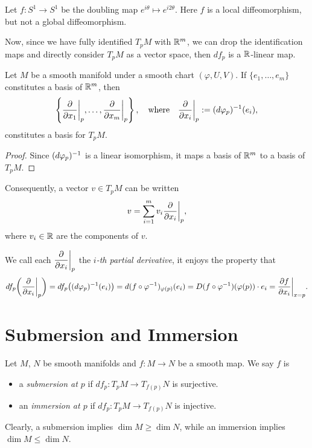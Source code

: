 \begin{example}
  Let \(f:S^1\to S^1\) be the doubling map \(e^{i\theta}\mapsto e^{i2\theta}\). Here \(f\) is a local diffeomorphism, but not a global diffeomorphism.
\end{example}

Now, since we have fully identified \(T_pM\) with \(\mathbb{R}^m\), we can drop the identification maps and directly consider \(T_pM\) as a vector space, then \(df_p\) is a \(\mathbb{R}\)-linear map.

\begin{proposition}
  Let \(M\) be a smooth manifold under a smooth chart \((\varphi,U,V)\). If \(\{e_1,\ldots,e_m\}\) constitutes a basis of \(\mathbb{R}^m\), then \[
    \left\{
      \dfrac{\partial}{\partial x_1}\bigg|_p, \ldots, \dfrac{\partial}{\partial x_m}\bigg|_p
    \right\},
    \quad\text{where}\quad
    \frac{\partial}{\partial x_i}\bigg|_p
    := (d\varphi_p)^{-1}(e_i),
  \] constitutes a basis for \(T_pM\).
\end{proposition}
\begin{proof}
  Since \((d\varphi_p)^{-1}\) is a linear isomorphism, it maps a basis of \(\mathbb{R}^m\) to a basis of \(T_pM\).
\end{proof}

Consequently, a vector \(v\in T_pM\) can be written \[
  v = \sum_{i=1}^m v_i \frac{\partial}{\partial x_i}\bigg|_p,
\] where \(v_i\in\mathbb{R}\) are the components of \(v\).

We call each \(\dfrac{\partial}{\partial x_i}\bigg|_p\) the \emph{\(i\)-th partial derivative}, it enjoys the property that 
\begin{align*}
  df_p\bigg(\frac{\partial}{\partial x_i}\bigg|_p\bigg)
  = df_p\big((d\varphi_p)^{-1}(e_i)\big)
  = d(f\circ\varphi^{-1})_{\varphi(p)}(e_i)
  = D(f\circ\varphi^{-1})(\varphi(p))\cdot e_i
  = \frac{\partial f}{\partial x_i}\bigg|_{x=p}.
\end{align*}

\section[Submersion and Immersion]{Submersion and Immersion}

\begin{definition}
  Let \(M\), \(N\) be smooth manifolds and \(f:M\to N\) be a smooth map. We say \(f\) is \begin{itemize}
    \item a \emph{submersion at \(p\)} if \(df_p:T_pM\to T_{f(p)}N\) is surjective.
    \item an \emph{immersion at \(p\)} if \(df_p:T_pM\to T_{f(p)}N\) is injective.
  \end{itemize}
\end{definition}
Clearly, a submersion implies \(\dim M \geq \dim N\), while an immersion implies \(\dim M \leq \dim N\).

